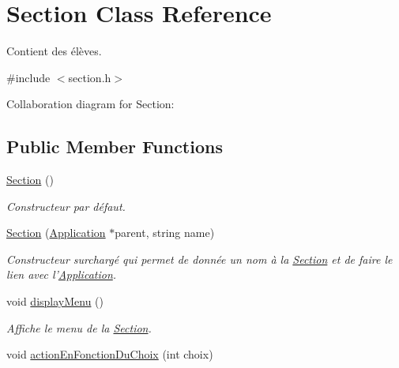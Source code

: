 \hypertarget{class_section}{\section{Section Class Reference}
\label{class_section}
}


Contient des élèves.  




{\ttfamily \#include $<$section.\-h$>$}



Collaboration diagram for Section\-:
\subsection*{Public Member Functions}
\begin{DoxyCompactItemize}
\item 
\hypertarget{class_section_a77b88e06692841ba49559d22a25a09f9}{\hyperlink{class_section_a77b88e06692841ba49559d22a25a09f9}{Section} ()}\label{class_section_a77b88e06692841ba49559d22a25a09f9}

\begin{DoxyCompactList}\small\item\em Constructeur par défaut. \end{DoxyCompactList}\item 
\hyperlink{class_section_ad4aca2b89eed415687a4ccd92d2b32ed}{Section} (\hyperlink{class_application}{Application} $\ast$parent, string name)
\begin{DoxyCompactList}\small\item\em Constructeur surchargé qui permet de donnée un nom à la \hyperlink{class_section}{Section} et de faire le lien avec l'\hyperlink{class_application}{Application}. \end{DoxyCompactList}\item 
\hypertarget{class_section_a8c35cb0ca6f58e706d3dc0b3a85631d7}{void \hyperlink{class_section_a8c35cb0ca6f58e706d3dc0b3a85631d7}{display\-Menu} ()}\label{class_section_a8c35cb0ca6f58e706d3dc0b3a85631d7}

\begin{DoxyCompactList}\small\item\em Affiche le menu de la \hyperlink{class_section}{Section}. \end{DoxyCompactList}\item 
\hypertarget{class_section_a0f5dca9b6e8598e289337ad64cb43803}{void \hyperlink{class_section_a0f5dca9b6e8598e289337ad64cb43803}{action\-En\-Fonction\-Du\-Choix} (int choix)}\label{class_section_a0f5dca9b6e8598e289337ad64cb43803}


\end{DoxyCompactItemize}

